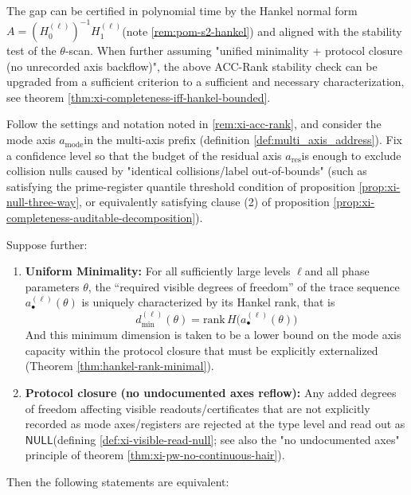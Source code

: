 \begin{remark}
The gap can be certified in polynomial time by the Hankel normal form \(A=(H_0^{(\ell)})^{-1}H_1^{(\ell)}\) ​​(note \ref{rem:pom-s2-hankel}) and aligned with the stability test of the \(\theta\)-scan.
When further assuming "unified minimality + protocol closure (no unrecorded axis backflow)", the above ACC-Rank stability check can be upgraded from a sufficient criterion to a sufficient and necessary characterization, see theorem \ref{thm:xi-completeness-iff-hankel-bounded}.
\end{remark}

\begin{theorem}\label{thm:xi-completeness-iff-hankel-bounded}
Follow the settings and notation noted in \ref{rem:xi-acc-rank}, and consider the mode axis \(a_{\mathrm{mode}}\) ​​in the multi-axis prefix (definition \ref{def:multi_axis_address}).
Fix a confidence level so that the budget of the residual axis \(a_{\mathrm{res}}\) ​​is enough to exclude collision nulls caused by "identical collisions/label out-of-bounds" (such as satisfying the prime-register quantile threshold condition of proposition \ref{prop:xi-null-three-way}, or equivalently satisfying clause (2) of proposition \ref{prop:xi-completeness-auditable-decomposition}).
\par
Suppose further:
\begin{enumerate}
  \item \textbf{Uniform Minimality:} For all sufficiently large levels \(\ell\) ​​and all phase parameters \(\theta\), the “required visible degrees of freedom” of the trace sequence \(a^{(\ell)}_\bullet(\theta)\) is uniquely characterized by its Hankel rank, that is
  \[
  d^{(\ell)}_{\min}(\theta)=\mathrm{rank}\,H\!\bigl(a^{(\ell)}_\bullet(\theta)\bigr)
  \]
  And this minimum dimension is taken to be a lower bound on the mode axis capacity within the protocol closure that must be explicitly externalized (Theorem \ref{thm:hankel-rank-minimal}).
  \item \textbf{Protocol closure (no undocumented axes reflow):} Any added degrees of freedom affecting visible readouts/certificates that are not explicitly recorded as mode axes/registers are rejected at the type level and read out as \(\mathsf{NULL}\) ​​(defining \ref{def:xi-visible-read-null}; see also the "no undocumented axes" principle of theorem \ref{thm:xi-pw-no-continuous-hair}).
\end{enumerate}
Then the following statements are equivalent:

\end{theorem}
